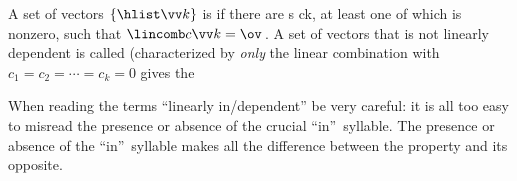 \begin{definition} \label{def:lindep} 
A set of vectors \(\{\hlist\vv k\}\) is  if there are s \hlist ck, at least one of which is nonzero, such that \(\lincomb c\vv k=\ov\)\,.
A set of vectors that is not linearly dependent is called  (characterized by \emph{only} the linear combination with \(c_1=c_2=\cdots=c_k=0\) gives the 
\end{definition}

When reading the terms ``linearly in/dependent'' be very careful: it is all too easy to misread the presence or absence of the crucial ``in''~syllable. 
The presence or absence of the ``in''~syllable makes all the difference between the property and its opposite.


